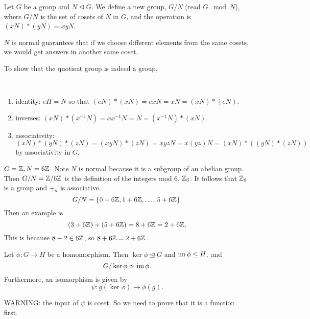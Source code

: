 \documentclass[class=article,crop=false]{standalone}
\begin{document}
\begin{defn}
	Let $ G$ be a group and  $ N \trianglelefteq G$. We define a new group, $ G / N$ (read $ G \mod N$), where $ G / N$ is the set of cosets of $ N$ in  $ G$, and the operation is $ (xN)*(yN)=xyN$.
\end{defn}
\begin{intuition}
	$ N$ is normal guarantees that if we choose different elements from the same cosets, we would get answers in another same coset.
\end{intuition}
To show that the quotient group is indeed a group, 
\begin{prf}
~\begin{enumerate}[label=(\roman*)]
	\item identity: $ eH = N$ so that  $ (eN)*(xN) = exN=xN=(xN)*(eN)$.
	\item inverses:  $ (xN)*(x^{-1}N) = x x^{-1} N = N = (x^{-1}N)*(xN)$.
	\item associativity: $ (xN)*(yN)*(zN)= (xyN)*(zN) = xyzN =x(yz)N = (xN)*((yN)*(zN))$ by associativity in  $ G$.
\end{enumerate}
\end{prf}
\begin{eg}[]
$ G= \mathbb{Z}, N = 6 \mathbb{Z}$. Note $ N$ is normal because it is a subgroup of an abelian group. Then $ G / N = \mathbb{Z} / 6 \mathbb{Z}$ is the definition of the integers mod 6, $ \mathbb{Z}_6$. It follows that $ \mathbb{Z}_6$ is a group and $ +_{ n} $ is associative.
\[
G /N = \{ 0+ 6 \mathbb{Z}, 1+ 6 \mathbb{Z}, \ldots, 5+6 \mathbb{Z}\} 
.\] 
Then an example is
\[
	(3+6 \mathbb{Z})+ (5 + 6 \mathbb{Z}) = 8+  6 \mathbb{Z} = 2 + 6 \mathbb{Z}
.\] 
This is because $ 8-2 \in 6 \mathbb{Z}$, so $ 8+ 6 \mathbb{Z} = 2 + 6 \mathbb{Z}$.
\end{eg}

\begin{thm}
Let $ \phi: G \to H $ be a homomorphism. Then $ \ker \phi \trianglelefteq G$ and $ \operatorname{im} \phi \leq H$, and
\[
G / \ker \phi \simeq \operatorname{im} \phi
.\] 
Furthermore, an isomorphism is given by 
 \[
	\psi: g( \ker \phi) \to \phi(g) 
.\]
\end{thm}
WARNING: the input of $ \psi$ is coset. So we need to prove that it is a function first. 
\end{document}
